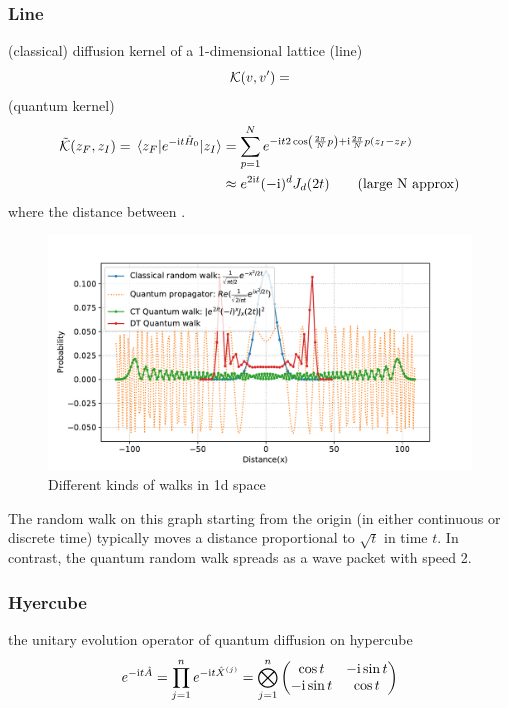 \subsubsection{Line}
(classical) diffusion kernel of a 1-dimensional lattice (line)
\begin{equation}
	\mathcal{K}(v,v') = 
\end{equation}
 (quantum kernel)
\begin{align}
	\tilde{\mathcal{K}}(z_F,z_I) = 
	\mel{z_F}{e^{-\textup{i}t\hat{H}_0 }}{z_I}
	&=\sum_{p=1}^{N} 
	e^{-\textup{i} t 2\cos(\frac{2\pi}{N}p) +\textup{i} \frac{2\pi}{N} p(z_I-z_F)} 
	\\
	&
	\approx e^{2\textup{i} t} (-\textup{i})^{d} J_{d} (2t)
	\tag{large N approx}
	\label{eq:ctqrw_kernel}
\end{align}
where the distance between .
\begin{figure}[!ht]
	\centering
	\includegraphics[width=.7\linewidth]{walk_propagator_1d.pdf}
	\caption{Different kinds of walks in 1d space}
\end{figure}
\begin{remark}
    The random walk on this graph starting from the origin (in either continuous or discrete time)
    typically moves a distance proportional to $\sqrt{t}$ in time $t$.
	In contrast, the quantum random walk spreads as a wave packet with speed 2.
\end{remark}

\subsubsection{Hyercube}
the unitary evolution operator of quantum diffusion on hypercube
\begin{equation}
	e^{-\textup{i} t \hat{A}} = 
	\prod_{j=1}^n e^{-\textup{i} t \hat{X}^{(j)} }
	= \bigotimes_{j=1}^n
	\begin{pmatrix}
		\cos t & -\textup{i} \sin t \\ 
		-\textup{i} \sin t & \cos t
	\end{pmatrix}
\end{equation}

